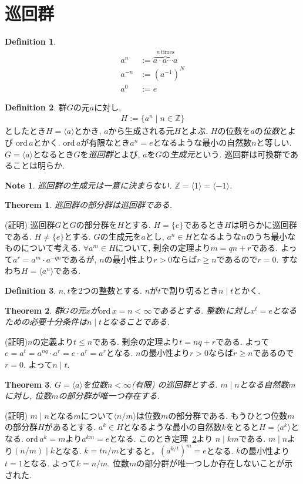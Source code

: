 \documentclass{article}
\theoremstyle{plain}
\newtheorem{theorem}{Theorem}
\theoremstyle{definition}
\newtheorem{definition}{Definition}
\theoremstyle{plain}
\newtheorem{note}{Note}
\numberwithin{equation}{section}
\numberwithin{theorem}{section}
\numberwithin{definition}{section}
\numberwithin{note}{section}
\begin{document}
\section{巡回群}
\begin{definition}
     \begin{align}
      a^n&:=\overbrace{a\cdot a\cdots a}^{n\,\mathrm{times}}\\
      a^{-n}&:=(a^{-1})^N\\
      a^0&:=e
     \end{align}
\end{definition}
\begin{definition}
     群$G$の元$a$に対し,
     \begin{align}
          H:=\lbrace a^n\mid n\in \mathbb{Z}\rbrace
     \end{align}
     としたとき$H=\langle a\rangle$とかき, $a$から生成される元$H$とよぶ. $H$の位数を$a$の\emph{位数}とよび $\mathrm{ord}\,a$とかく. $\mathrm{ord}\,a$が有限なとき$a^n=e$となるような最小の自然数$n$と等しい. $G=\langle a\rangle$となるとき$G$を\emph{巡回群}とよび, $a$を$G$の\emph{生成元}という. 巡回群は可換群であることは明らか.
\end{definition}
\begin{note}
     巡回群の生成元は一意に決まらない. $\mathbb{Z}=\langle 1\rangle=\langle-1\rangle$.
\end{note}
\begin{theorem}
     巡回群の部分群は巡回群である.
\end{theorem}
(証明) 巡回群$G$と$G$の部分群を$H$とする. $H=\lbrace e\rbrace$であるとき$H$は明らかに巡回群である.
$H\neq \lbrace e\rbrace$とする. $G$の生成元を$a$とし, $a^n\in H$となるような$n$のうち最小なものについて考える. $\forall a^m \in H$について, 剰余の定理より$m=qn+r$である. 
よって$a^r= a^m\cdot a^{-qn}$であるが, $n$の最小性より$r>0$ならば$r\geq n$であるので$r=0$.
すなわち$H=\langle a^n\rangle$である.
\begin{definition}
     $n,t$を2つの整数とする. $n$が$t$で割り切るとき$n\mid t$とかく.
\end{definition}
\begin{theorem}\label{them::n|t}
     群$G$の元$x$が$\mathrm{ord}\, x=n <\infty$であるとする. 整数$t$に対し$x^t=e$となるための必要十分条件は$n\mid t$となることである.
\end{theorem}
(証明)$n$の定義より$t\leq n$である. 剰余の定理より$t=nq+r$である. よって$e=a^t=a^{nq}\cdot a^r=e\cdot a^r=a^r$となる. $n$の最小性より$r> 0$ならば$r\geq n$であるので$r=0$. よって$n\mid t$.
\begin{theorem}
    $G=\langle a\rangle$を位数$n<\infty$(有限) の巡回群とする. $m\mid n$となる自然数$m$に対し, 位数$m$の部分群が唯一つ存在する. 
\end{theorem}
(証明) $m\mid n$となる$m$について$\langle n/m\rangle$は位数$m$の部分群である. もうひとつ位数$m$の部分群$H$があるとする. $a^k\in H$となるような最小の自然数$k$をとると$H=\langle a^k \rangle$となる. $\mathrm{ord}\, a^k=m$より$a^{km}=e$となる. このとき定理~\ref{them::n|t}より $n\mid km$である. $m\mid n$より$(n/m)\mid k$となる. $k= tn/m$とすると，$(a^{k/t})^m=e$となる. $k$の最小性より$t=1$となる. よって$k=n/m$. 位数$m$の部分群が唯一つしか存在しないことが示された.
\end{document}
